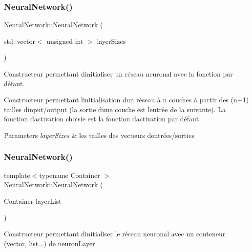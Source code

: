 \subsubsection{\texorpdfstring{Neural\+Network()}{NeuralNetwork()}\hspace{0.1cm}{\footnotesize\ttfamily [2/3]}}
{\footnotesize\ttfamily Neural\+Network\+::\+Neural\+Network (\begin{DoxyParamCaption}\item[{std\+::vector$<$ unsigned int $>$}]{layer\+Sizes }\end{DoxyParamCaption})}



Constructeur permettant d\textquotesingle{}initialiser un réseau neuronal avec la fonction par défaut. 

Constructeur permettant l\textquotesingle{}initialisation d\textquotesingle{}un réseau à n couches à partir des (n+1) tailles d\textquotesingle{}input/output (la sortie d\textquotesingle{}une couche est l\textquotesingle{}entrée de la suivante). La fonction d\textquotesingle{}activation choisie est la fonction d\textquotesingle{}activation par défaut 
\begin{DoxyParams}{Parameters}
{\em layer\+Sizes} & les tailles des vecteurs d\textquotesingle{}entrées/sorties \\
\hline
\end{DoxyParams}
\mbox{\label{classNeuralNetwork_a7943bb4e9cb96aae048b236d4f1dd979}} 
\subsubsection{\texorpdfstring{Neural\+Network()}{NeuralNetwork()}\hspace{0.1cm}{\footnotesize\ttfamily [3/3]}}
{\footnotesize\ttfamily template$<$typename Container $>$ \\
Neural\+Network\+::\+Neural\+Network (\begin{DoxyParamCaption}\item[{Container}]{layer\+List }\end{DoxyParamCaption})}



Constructeur permettant d\textquotesingle{}initialiser le réseau neuronal avec un conteneur (vector, list...) de neuron\+Layer. 


